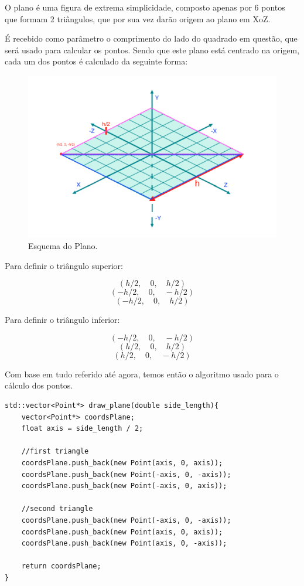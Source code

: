 \documentclass[a4paper]{article}
\begin{document}
O plano é uma figura de extrema simplicidade, composto apenas por 6 pontos que formam 2 triângulos, que por sua vez darão origem ao plano em XoZ.


É recebido como parâmetro o comprimento do lado do quadrado em questão, que será usado para calcular os pontos. Sendo que este plano está centrado na origem, cada um dos pontos é calculado da seguinte forma:

\begin{figure}[H]
    \centering
    \includegraphics[width=0.5\linewidth]{esquemaPlano.PNG}
    \caption{Esquema do Plano.}
\end{figure}

Para definir o triângulo superior:

\[(h/2,\quad 0, \quad h/2)\]
\[(-h/2,\quad  0, \quad -h/2)\]
\[(-h/2,\quad  0, \quad h/2)\]

Para definir o triângulo inferior:

\[(-h/2, \quad 0, \quad -h/2)\]
\[(h/2, \quad  0, \quad  h/2)\]
\[(h/2, \quad  0, \quad -h/2)\]

Com base em tudo referido até agora, temos então o algoritmo usado para o cálculo dos pontos.

\begin{lstlisting}
std::vector<Point*> draw_plane(double side_length){
    vector<Point*> coordsPlane;
    float axis = side_length / 2;

    //first triangle
    coordsPlane.push_back(new Point(axis, 0, axis));
    coordsPlane.push_back(new Point(-axis, 0, -axis));
    coordsPlane.push_back(new Point(-axis, 0, axis));

    //second triangle
    coordsPlane.push_back(new Point(-axis, 0, -axis));
    coordsPlane.push_back(new Point(axis, 0, axis));
    coordsPlane.push_back(new Point(axis, 0, -axis));

    return coordsPlane;
}

\end{lstlisting}
\end{document}
